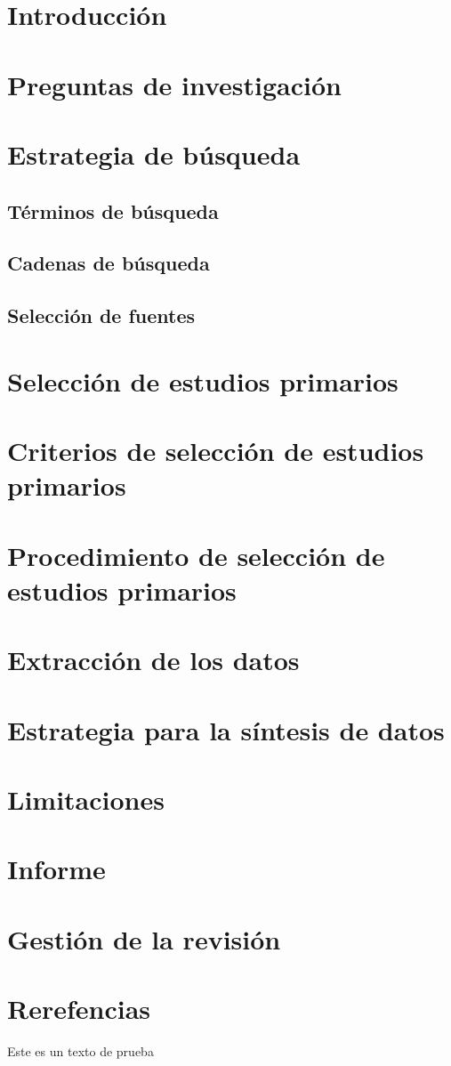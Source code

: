 \documentclass{article}
\begin{document}
\section{Introducción}
\section{Preguntas de investigación}
\section{Estrategia de búsqueda}
\subsection{Términos de búsqueda}
\subsection{Cadenas de búsqueda}
\subsection{Selección de fuentes}
\section{Selección de estudios primarios}
\section{Criterios de selección de estudios primarios}
\section{Procedimiento de selección de estudios primarios}
\section{Extracción de los datos}
\section{Estrategia para la síntesis de datos}
\section{Limitaciones}
\section{Informe}
\section{Gestión de la revisión}
\section{Rerefencias}

Este es un texto de prueba 
\end{document}
